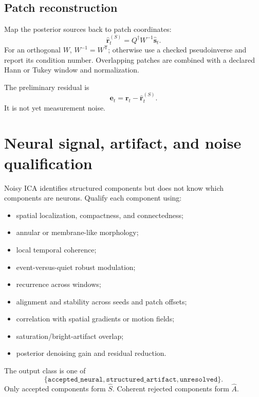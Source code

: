 \documentclass[11pt]{article}
\newcommand{\trans}{\mathsf T}
\begin{document}
\subsection{Patch reconstruction}

Map the posterior sources back to patch coordinates:
\begin{equation}
\widehat{\bm r}^{(S)}_t
=Q^{\dagger}W^{-1}\widehat{\bm s}_t.
\end{equation}
For an orthogonal $W$, $W^{-1}=W^{\trans}$; otherwise use a checked
pseudoinverse and report its condition number. Overlapping patches are combined
with a declared Hann or Tukey window and normalization.

The preliminary residual is
\begin{equation}
\bm e_t=\bm r_t-\widehat{\bm r}^{(S)}_t.
\end{equation}
It is not yet measurement noise.

\section{Neural signal, artifact, and noise qualification}

Noisy ICA identifies structured components but does not know which components
are neurons. Qualify each component using:
\begin{itemize}[leftmargin=*]
\item spatial localization, compactness, and connectedness;
\item annular or membrane-like morphology;
\item local temporal coherence;
\item event-versus-quiet robust modulation;
\item recurrence across windows;
\item alignment and stability across seeds and patch offsets;
\item correlation with spatial gradients or motion fields;
\item saturation/bright-artifact overlap;
\item posterior denoising gain and residual reduction.
\end{itemize}
The output class is one of
\begin{equation}
\{\texttt{accepted\_neural},
\texttt{structured\_artifact},
\texttt{unresolved}\}.
\end{equation}
Only accepted components form $\widehat S$. Coherent rejected components form
$\widehat A$.
\end{document}
